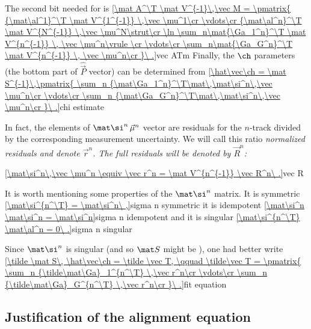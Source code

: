 The second bit needed for  is
\eqref{\mat A^\T \mat V^{-1}\,\vec M = \pmatrix{
{\mat\al^1}^\T \mat V^{1^{-1}} \,\vec \mu^1\cr
\vdots\cr
{\mat\al^n}^\T \mat V^{N^{-1}} \,\vec \mu^N\strut\cr
\ln
\sum_n\mat{\Ga_1^n}^\T \mat V^{n^{-1}} \, \vec \mu^n\vrule width0pt height15pt\cr
\vdots\cr
\sum_n\mat{\Ga_G^n}^\T \mat V^{n^{-1}} \, \vec \mu^n\cr
}\ .}{vec ATm}
Finally, the $\ch$ parameters (the bottom part of $\hat\vec P$ vector) can be determined from
\eqref{\hat\vec\ch = \mat S^{-1}\,\pmatrix{
\sum_n {\mat\Ga_1^n}^\T\mat\,\mat\si^n\,\vec \mu^n\cr
\vdots\cr
\sum_n {\mat\Ga_G^n}^\T\mat\,\mat\si^n\,\vec \mu^n\cr
}\ .}{chi estimate}

In fact, the elements of $\mat\si^n\,\vec \mu^n$ vector are residuals for the $n$-track divided by the corresponding measurement uncertainty. We will call this ratio \em{normalized} residuals and denote $\vec r^n$. The full residuals will be denoted by $\vec R^n$:

\eqref{\mat\si^n\,\vec \mu^n \equiv \vec r^n = \mat V^{n^{-1}} \vec R^n\ .}{vec R}

It is worth mentioning some properties of the $\mat\si^n$ matrix. It is symmetric
\eqref{\mat\si^{n^\T} = \mat\si^n\ ,}{sigma n symmetric}
it is idempotent
\eqref{\mat\si^n \mat\si^n = \mat\si^n}{sigma n idempotent}
and it is singular
\eqref{\mat\si^{n^\T} \mat\al^n = 0\ .}{sigma n singular}

Since $\mat\si^n$ is singular (and so $\mat S$ might be ), one had better write
\eqref{\tilde \mat S\, \hat\vec\ch = \tilde \vec T, \qquad 
\tilde\vec T = \pmatrix{
\sum_n {\tilde\mat\Ga}_1^{n^\T} \,\vec r^n\cr
\vdots\cr
\sum_n {\tilde\mat\Ga}_G^{n^\T} \,\vec r^n\cr
}\ .}{fit equation}



\subsection[al fit eq]{Justification of the alignment equation}

